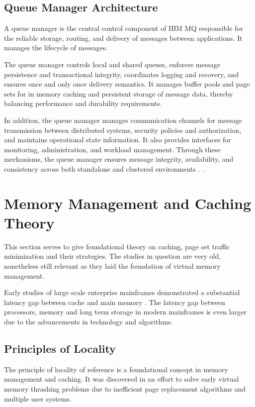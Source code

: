 \subsection{Queue Manager Architecture}%
\label{subsec:qmgr-architecture}

A queue manager is the central control component of IBM MQ responsible for the reliable storage, routing, and delivery of messages between applications. It manages the lifecycle of messages.

The queue manager controls local and shared queues, enforces message persistence and transactional integrity, coordinates logging and recovery, and ensures once and only once delivery semantics. It manages buffer pools and page sets for in memory caching and persistent storage of message data, thereby balancing performance and durability requirements.

In addition, the queue manager manages communication channels for message transmission between distributed systems, security policies and authorization, and maintains operational state information. It also provides interfaces for monitoring, administration, and workload management. Through these mechanisms, the queue manager ensures message integrity, availability, and consistency across both standalone and clustered environments . \autocite{ibm2025_mq_qmgr}.

\section{Memory Management and Caching Theory}%
\label{sec:caching-theory}

This section serves to give foundational theory on caching, page set traffic minimization and their strategies. The studies in question are very old, nonetheless still relevant as they laid the foundation of virtual memory management. 


Early studies of large scale enterprise mainframes demonstrated a substantial latency gap between cache and main memory
\autocite{smith1982_cache_memories}. 
The latency gap between processors, memory and long term storage in modern mainframes is even larger due to the advancements in technology and algorithms.

\subsection{Principles of Locality}%
\label{subsec:locality}


The principle of locality of reference is a foundational concept in memory management and caching. It was discovered in an effort to solve early virtual memory thrashing problems due to inefficient page replacement algorithms and multiple user systems. 

